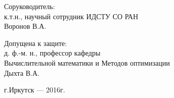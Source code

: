 \begin{titlepage}
\begin{singlespacing}
\begin{flushright}
{      Соруководитель:\\
      к.т.н., научный сотрудник ИДСТУ СО РАН\\
      \underline{\phantom{Четкая подпись}} Воронов В.А. 

      \vspace{1em}

      Допущена к защите:\\
      д. ф.-м. н., профессор кафедры\\ Вычислительной математики и Методов оптимизации \\ 
      \underline{\phantom{Четкая подпись}} Дыхта В.А. 

      }
    \end{flushright}
    
    \vspace{\fill}

    \begin{center}
      г.Иркутск --- 2016г.
    \end{center}
    
  \end{singlespacing}
\end{titlepage}

